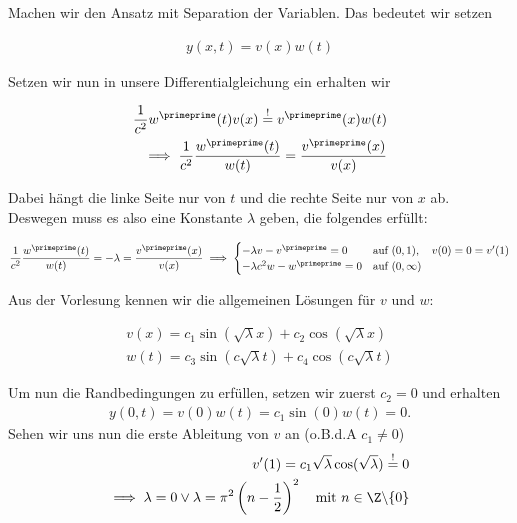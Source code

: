 \begin{solution}
Machen wir den Ansatz mit Separation der Variablen. Das bedeutet wir setzen

\begin{align*}
  y(x,t)
  =
  v(x)w(t)
\end{align*}

Setzen wir nun in unsere Differentialgleichung ein erhalten wir

\begin{align*}
  \frac{1}{c^2}w^\primeprime(t)v(x)
  \stackrel{!}{=}
  v^\primeprime(x)w(t) \\
  \implies
  \frac{1}{c^2}\frac{w^\primeprime(t)}{w(t)}
  =
  \frac{v^\primeprime(x)}{v(x)}
\end{align*}

Dabei hängt die linke Seite nur von $t$ und die rechte Seite nur von $x$ ab. Deswegen
muss es also eine Konstante $\lambda$ geben, die folgendes erfüllt:

\begin{align*}
  \frac{1}{c^2}\frac{w^\primeprime(t)}{w(t)}
  =
  -\lambda
  =
  \frac{v^\primeprime(x)}{v(x)}
  \implies
  \begin{cases}
    -\lambda v - v^\primeprime = 0 & \text{auf } (0,1), \quad v(0)=0=v^\prime(1) \\
    -\lambda c^2 w - w^\primeprime = 0 & \text{auf }(0,\infty)
  \end{cases}
\end{align*}

Aus der Vorlesung kennen wir die allgemeinen Lösungen für $v$ und  $w$:

\begin{align*}
  v(x) = c_1 \sin(\sqrt{\lambda}x) + c_2 \cos(\sqrt{\lambda}x) \\
  w(t) = c_3 \sin(c\sqrt{\lambda}t) + c_4 \cos(c\sqrt{\lambda}t)
\end{align*}

Um nun die Randbedingungen zu erfüllen, setzen wir zuerst $c_2 = 0$ und erhalten
\begin{align*}
  y(0,t) = v(0)w(t) = c_1\sin(0)w(t) = 0.
\end{align*}
Sehen wir uns nun die erste Ableitung
von $v$ an (o.B.d.A $c_1 \neq 0$)
\begin{align*}
  v^\prime(1)
  =
  c_1 \sqrt{\lambda}\cos(\sqrt{\lambda})
  \stackrel{!}{=}
  0 \\
  \implies
  \lambda = 0
  \lor
  \lambda
  =
  \pi^2\left(n - \frac{1}{2}\right)^2 \quad \text{mit } n\in \Z \backslash\{0\}
\end{align*}


\end{solution}
